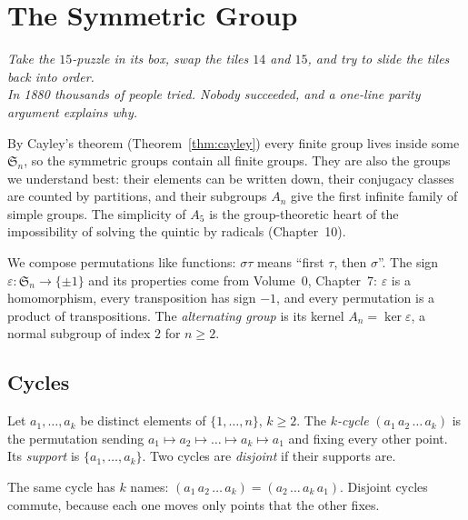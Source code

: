 \chapter{The Symmetric Group}

\begin{center}\itshape
Take the $15$-puzzle in its box, swap the tiles $14$ and $15$, and try to slide the tiles back into order.\\
In 1880 thousands of people tried. Nobody succeeded, and a one-line parity argument explains why.
\end{center}

By Cayley's theorem (Theorem~\ref{thm:cayley}) every finite group lives inside some $\mathfrak S_n$, so the symmetric groups contain all finite groups. They are also the groups we understand best: their elements can be written down, their conjugacy classes are counted by partitions, and their subgroups $A_n$ give the first infinite family of simple groups. The simplicity of $A_5$ is the group-theoretic heart of the impossibility of solving the quintic by radicals (Chapter~10).

We compose permutations like functions: $\sigma\tau$ means ``first $\tau$, then $\sigma$''. The sign $\varepsilon:\mathfrak S_n\to\{\pm1\}$ and its properties come from Volume~0, Chapter~7: $\varepsilon$ is a homomorphism, every transposition has sign $-1$, and every permutation is a product of transpositions. The \emph{alternating group} is its kernel $A_n=\ker\varepsilon$, a normal subgroup of index $2$ for $n\ge2$.

\section{Cycles}

\begin{definition}\label{def:cycle}
Let $a_1,\dots,a_k$ be distinct elements of $\{1,\dots,n\}$, $k\ge2$. The \emph{$k$-cycle} $(a_1\,a_2\,\dots\,a_k)$ is the permutation sending $a_1\mapsto a_2\mapsto\dots\mapsto a_k\mapsto a_1$ and fixing every other point. Its \emph{support} is $\{a_1,\dots,a_k\}$. Two cycles are \emph{disjoint} if their supports are.
\end{definition}

The same cycle has $k$ names: $(a_1\,a_2\,\dots\,a_k)=(a_2\,\dots\,a_k\,a_1)$. Disjoint cycles commute, because each one moves only points that the other fixes.

